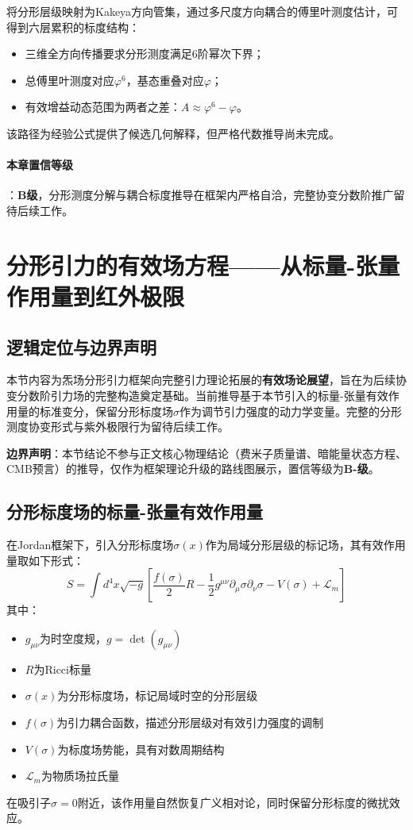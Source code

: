 \documentclass[12pt,a4paper,twocolumn]{article}
\renewcommand{\phi}{\varphi}
\begin{document}
将分形层级映射为Kakeya方向管集，通过多尺度方向耦合的傅里叶测度估计，可得到六层累积的标度结构：
\begin{itemize}
\item 三维全方向传播要求分形测度满足6阶幂次下界；
\item 总傅里叶测度对应$\phi^6$，基态重叠对应$\phi$；
\item 有效增益动态范围为两者之差：$A \approx \phi^6 - \phi$。
\end{itemize}
该路径为经验公式提供了候选几何解释，但严格代数推导尚未完成。

\paragraph{本章置信等级}：\textbf{B级}，分形测度分解与耦合标度推导在框架内严格自洽，完整协变分数阶推广留待后续工作。

\section{分形引力的有效场方程——从标量-张量作用量到红外极限}
\label{sec:effective_gravity}

\subsection{逻辑定位与边界声明}
本节内容为炁场分形引力框架向完整引力理论拓展的\textbf{有效场论展望}，旨在为后续协变分数阶引力场的完整构造奠定基础。当前推导基于本节引入的标量-张量有效作用量的标准变分，保留分形标度场$\sigma$作为调节引力强度的动力学变量。完整的分形测度协变形式与紫外极限行为留待后续工作。

\textbf{边界声明}：本节结论不参与正文核心物理结论（费米子质量谱、暗能量状态方程、CMB预言）的推导，仅作为框架理论升级的路线图展示，置信等级为\textbf{B-级}。

\subsection{分形标度场的标量-张量有效作用量}
在Jordan框架下，引入分形标度场$\sigma(x)$作为局域分形层级的标记场，其有效作用量取如下形式：
\begin{equation}
S = \int d^4x \sqrt{-g} \left[ \frac{f(\sigma)}{2} R - \frac{1}{2} g^{\mu\nu} \partial_\mu\sigma \partial_\nu\sigma - V(\sigma) + \mathcal{L}_m \right]
\label{eq:scalar_tensor_action}
\end{equation}
其中：
\begin{itemize}
\item $g_{\mu\nu}$为时空度规，$g = \det(g_{\mu\nu})$
\item $R$为Ricci标量
\item $\sigma(x)$为分形标度场，标记局域时空的分形层级
\item $f(\sigma)$为引力耦合函数，描述分形层级对有效引力强度的调制
\item $V(\sigma)$为标度场势能，具有对数周期结构
\item $\mathcal{L}_m$为物质场拉氏量
\end{itemize}
在吸引子$\sigma=0$附近，该作用量自然恢复广义相对论，同时保留分形标度的微扰效应。
\end{document}
